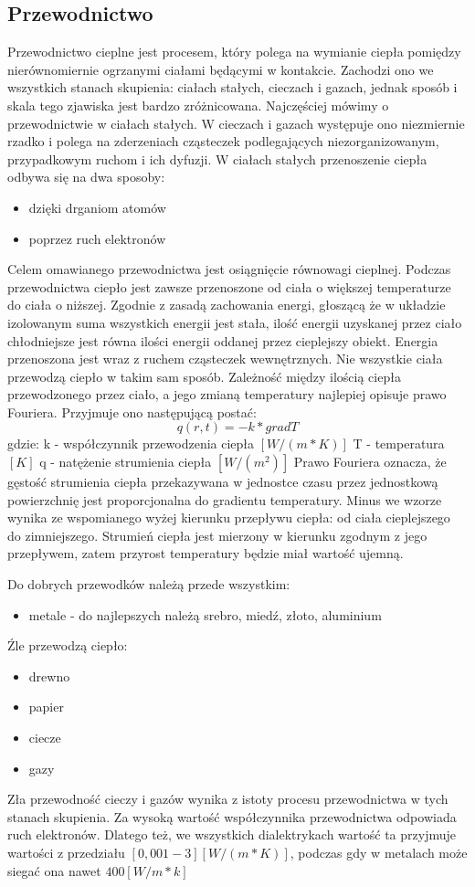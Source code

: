 \subsection {Przewodnictwo}
\label{Przewodnictwo}
 Przewodnictwo cieplne jest procesem, który polega  na wymianie ciepła 
pomiędzy nierównomiernie ogrzanymi ciałami będącymi w kontakcie. Zachodzi ono we wszystkich stanach skupienia: ciałach stałych, cieczach i gazach, jednak sposób i skala tego zjawiska jest bardzo zróżnicowana. Najczęściej mówimy o przewodnictwie w ciałach stałych.
W cieczach i gazach występuje ono niezmiernie rzadko i polega na zderzeniach cząsteczek podlegających
niezorganizowanym, przypadkowym ruchom i ich dyfuzji.
W ciałach stałych przenoszenie ciepła odbywa się  na dwa sposoby:
\begin{itemize}
\item dzięki drganiom atomów
\item poprzez ruch elektronów
\end {itemize}
Celem omawianego przewodnictwa jest 
osiągnięcie równowagi cieplnej. Podczas przewodnictwa ciepło jest zawsze przenoszone od
ciała o większej temperaturze do ciała o niższej. Zgodnie z zasadą zachowania energi, głoszącą że w układzie 
izolowanym suma wszystkich energii jest stała, ilość energii uzyskanej przez ciało chłodniejsze jest równa
ilości energii oddanej przez cieplejszy obiekt. Energia przenoszona jest wraz z ruchem cząsteczek wewnętrznych.
Nie wszystkie ciała przewodzą ciepło w takim sam sposób.
Zależność między ilością ciepła przewodzonego przez ciało, a jego zmianą temperatury najlepiej opisuje prawo Fouriera.
Przyjmuje ono następującą postać:
\begin{equation}
 q(r,t)=-k*grad T
 \label{eqn:fourier}
\end {equation}
gdzie:
k - współczynnik przewodzenia ciepła $[W / (m*K)]$
T - temperatura $[K]$
q - natężenie strumienia ciepła  $[W/(m^2)]$
Prawo Fouriera oznacza, że gęstość strumienia ciepła przekazywana w jednostce czasu przez jednostkową powierzchnię 
jest proporcjonalna do gradientu temperatury. Minus we wzorze wynika ze wspomianego wyżej kierunku przepływu ciepła:
od ciała cieplejszego do zimniejszego. Strumień ciepła jest mierzony w kierunku zgodnym z jego przepływem, zatem przyrost
temperatury będzie miał wartość ujemną.


Do dobrych przewodków należą przede wszystkim:
\begin {itemize}
\item metale - do najlepszych należą srebro, miedź, złoto, aluminium
\end {itemize}
Źle przewodzą ciepło:
\begin {itemize}
\item drewno
\item papier
\item ciecze
\item gazy
\end {itemize}
Zła przewodność cieczy i gazów wynika z istoty procesu przewodnictwa w tych stanach skupienia. Za wysoką wartość 
współczynnika przewodnictwa odpowiada ruch elektronów. Dlatego też, we wszystkich dialektrykach wartość ta
przyjmuje wartości z przedziału $[0,001-3][W/(m*K)]$, podczas gdy w metalach może siegać ona nawet $ 400 [W/m*k]$

